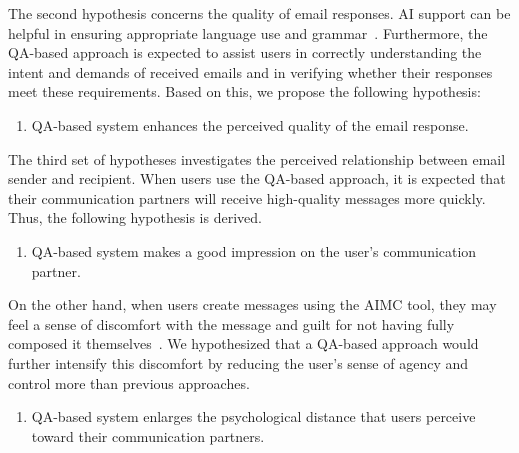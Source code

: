 The second hypothesis concerns the quality of email responses.
AI support can be helpful in ensuring appropriate language use and grammar~\cite{fu2024text}. 
Furthermore, the QA-based approach is expected to assist users in correctly understanding the intent and demands of received emails and in verifying whether their responses meet these requirements.
Based on this, we propose the following hypothesis:
\begin{enumerate}[\textrm{H2}:]
    \item QA-based system enhances the perceived quality of the email response.
\end{enumerate}

The third set of hypotheses investigates the perceived relationship between email sender and recipient.
When users use the QA-based approach, it is expected that their communication partners will receive high-quality messages more quickly. 
Thus, the following hypothesis is derived.
\begin{enumerate}[\textrm{H3-}a:]
    \item QA-based system makes a good impression on the user's communication partner.
\end{enumerate}

On the other hand, when users create messages using the AIMC tool, they may feel a sense of discomfort with the message and guilt for not having fully composed it themselves~\cite{fu2024text}. 
We hypothesized that a QA-based approach would further intensify this discomfort by reducing the user’s sense of agency and control more than previous approaches.
\begin{enumerate}[\textrm{H3-}b:]
    \item QA-based system enlarges the psychological distance that users perceive toward their communication partners.
\end{enumerate}